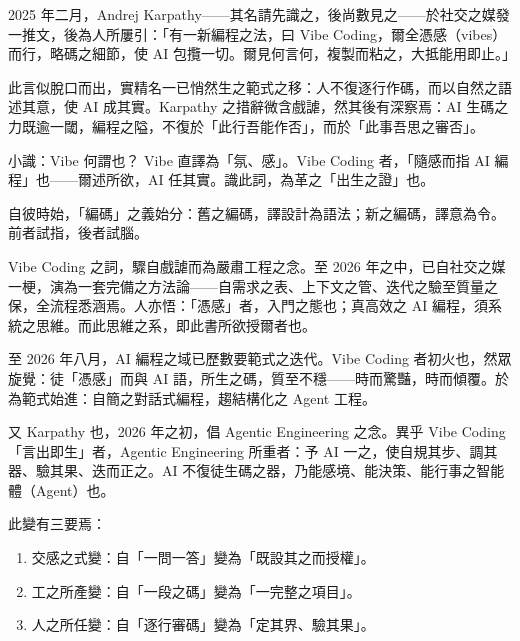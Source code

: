 


2025 年二月，Andrej Karpathy——其名請先識之，後尚數見之——於社交之媒發一推文，後為人所屢引：「有一新編程之法，曰 Vibe Coding，爾全憑感（vibes）而行，略碼之細節，使 AI 包攬一切。爾見何言何，複製而粘之，大抵能用即止。」

此言似脫口而出，實精名一已悄然生之範式之移：人不復逐行作碼，而以自然之語述其意，使 AI 成其實。Karpathy 之措辭微含戲謔，然其後有深察焉：AI 生碼之力既逾一閾，編程之隘，不復於「此行吾能作否」，而於「此事吾思之審否」。

\begin{tcbinfo}{小識：Vibe 何謂也？}
Vibe 直譯為「氛、感」。Vibe Coding 者，「隨感而指 AI 編程」也——爾述所欲，AI 任其實。識此詞，為革之「出生之證」也。

\end{tcbinfo}

自彼時始，「編碼」之義始分：舊之編碼，譯設計為語法；新之編碼，譯意為令。前者試指，後者試腦。

Vibe Coding 之詞，驟自戲謔而為嚴肅工程之念。至 2026 年之中，已自社交之媒一梗，演為一套完備之方法論——自需求之表、上下文之管、迭代之驗至質量之保，全流程悉涵焉。人亦悟：「憑感」者，入門之態也；真高效之 AI 編程，須系統之思維。而此思維之系，即此書所欲授爾者也。


至 2026 年八月，AI 編程之域已歷數要範式之迭代。Vibe Coding 者初火也，然眾旋覺：徒「憑感」而與 AI 語，所生之碼，質至不穩——時而驚豔，時而傾覆。於為範式始進：自簡之對話式編程，趨結構化之 Agent 工程。

又 Karpathy 也，2026 年之初，倡 Agentic Engineering 之念。異乎 Vibe Coding「言出即生」者，Agentic Engineering 所重者：予 AI 一之，使自規其步、調其器、驗其果、迭而正之。AI 不復徒生碼之器，乃能感境、能決策、能行事之智能體（Agent）也。

此變有三要焉：

\begin{enumerate}
  \item 交感之式變：自「一問一答」變為「既設其之而授權」。
  \item 工之所產變：自「一段之碼」變為「一完整之項目」。
  \item 人之所任變：自「逐行審碼」變為「定其界、驗其果」。
\end{enumerate}

